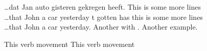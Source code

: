 \documentclass[11pt]{article}
\begin{document}
\begin{exe}
\ex\label{scramble-det}
\begin{xlist}
        \ex 
        \gll 
        \ldots dat Jan  auto gisteren   gekregen heeft. This is some more lines \\
        \ldots that John a car  yesterday t gotten has this is some more lines \\
        \ldots that John a car yesterday.
        \ex Another  with .
        \ex Another example.
\end{xlist}
\ex This  verb movement 
\ex This  verb movement 
\end{exe}

\begin{exe}


\end{exe}
\end{document}
